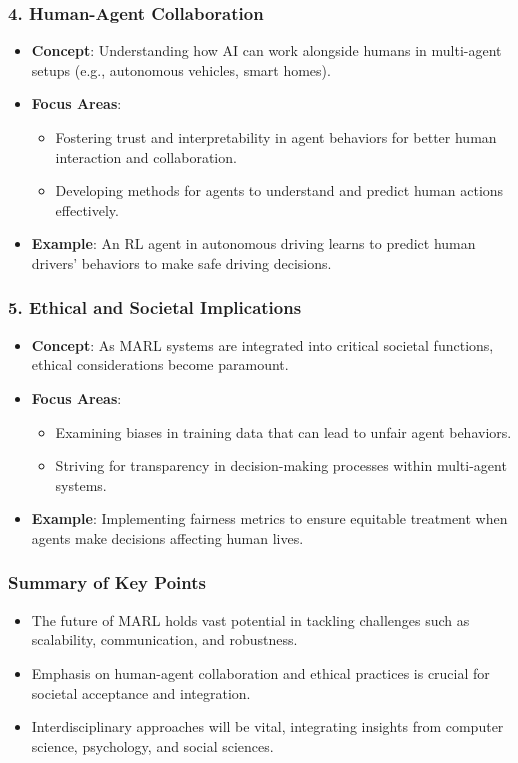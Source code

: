 \documentclass[aspectratio=169]{beamer}
\begin{document}
\begin{frame}[fragile]
    \frametitle{4. Human-Agent Collaboration}
    \begin{itemize}
        \item \textbf{Concept}: Understanding how AI can work alongside humans in multi-agent setups (e.g., autonomous vehicles, smart homes).
        \item \textbf{Focus Areas}:
        \begin{itemize}
            \item Fostering trust and interpretability in agent behaviors for better human interaction and collaboration.
            \item Developing methods for agents to understand and predict human actions effectively.
        \end{itemize}
        \item \textbf{Example}: An RL agent in autonomous driving learns to predict human drivers' behaviors to make safe driving decisions.
    \end{itemize}
\end{frame}

\begin{frame}[fragile]
    \frametitle{5. Ethical and Societal Implications}
    \begin{itemize}
        \item \textbf{Concept}: As MARL systems are integrated into critical societal functions, ethical considerations become paramount.
        \item \textbf{Focus Areas}:
        \begin{itemize}
            \item Examining biases in training data that can lead to unfair agent behaviors.
            \item Striving for transparency in decision-making processes within multi-agent systems.
        \end{itemize}
        \item \textbf{Example}: Implementing fairness metrics to ensure equitable treatment when agents make decisions affecting human lives.
    \end{itemize}
\end{frame}

\begin{frame}[fragile]
    \frametitle{Summary of Key Points}
    \begin{itemize}
        \item The future of MARL holds vast potential in tackling challenges such as scalability, communication, and robustness.
        \item Emphasis on human-agent collaboration and ethical practices is crucial for societal acceptance and integration.
        \item Interdisciplinary approaches will be vital, integrating insights from computer science, psychology, and social sciences.
    \end{itemize}
\end{frame}
\end{document}
